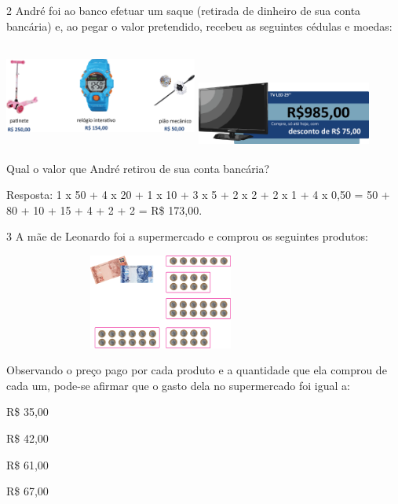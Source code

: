 {\num{2} André foi ao banco efetuar um saque (retirada de dinheiro de sua conta
bancária) e, ao pegar o valor pretendido, recebeu as seguintes cédulas e moedas:


\includegraphics[width=2.50022in,height=1.34178in]{media/image72.png}
\includegraphics[width=2.26686in,height=0.87508in]{media/image73.png}

Qual o valor que André retirou de sua conta bancária?


Resposta:
1 x 50 + 4 x 20 + 1 x 10 + 3 x 5 + 2 x 2 + 2 x 1 + 4 x 0,50 = 50 + 80 +
10 + 15 + 4 + 2 + 2 = R\$ 173,00.

\num{3} A mãe de Leonardo foi a supermercado e comprou os seguintes produtos:


\includegraphics[width=4.10036in,height=1.22511in]{media/image74.png}

Observando o preço pago por cada produto e a quantidade que ela comprou de cada um, pode-se afirmar que o gasto dela no supermercado foi igual a:

\begin{escolha}

\item
  R\$ 35,00
\item
  R\$ 42,00
\item
  R\$ 61,00
\item
  R\$ 67,00
\end{escolha}

}
